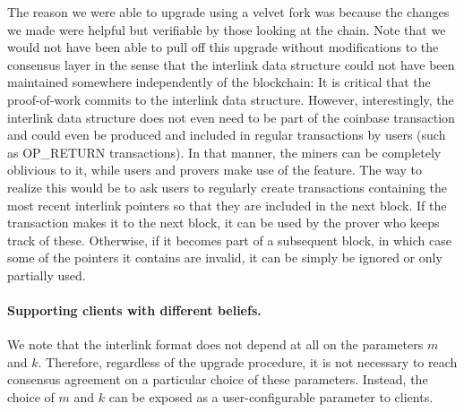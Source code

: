 The reason we were able to upgrade using a velvet fork was because the changes
we made were helpful but verifiable by those looking at the chain. Note that we
would not have been able to pull off this upgrade without modifications to the
consensus layer in the sense that the interlink data structure could not have
been maintained somewhere independently of the blockchain: It is critical that
the proof-of-work commits to the interlink data structure. However,
interestingly, the interlink data structure does not even need to be part of
the coinbase transaction and could even be produced and included in regular
transactions by users (such as OP\_RETURN transactions). In that manner, the
miners can be completely oblivious to it, while users and provers make use of
the feature. The way to realize this would be to ask users to regularly create
transactions containing the most recent interlink pointers so that they are
included in the next block. If the transaction makes it to the next block, it
can be used by the prover who keeps track of these. Otherwise, if it becomes
part of a subsequent block, in which case some of the pointers it contains are
invalid, it can be simply be ignored or only partially used.

\paragraph{Supporting clients with different beliefs.}
We note that the interlink format does not depend at all on the parameters $m$ and $k$.
Therefore, regardless of the upgrade procedure, it is not necessary to reach consensus agreement on a particular choice of these parameters. Instead, the choice of $m$ and $k$ can be exposed as a user-configurable parameter to clients.


